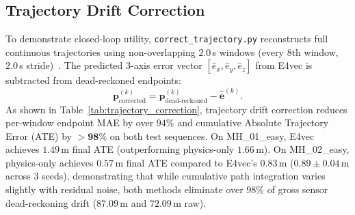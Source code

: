 \subsection{Trajectory Drift Correction}
To demonstrate closed-loop utility, \texttt{correct\_trajectory.py} reconstructs full continuous trajectories using non-overlapping $2.0$\,s windows (every 8th window, $2.0$\,s stride)~\cite{r5brossard2020}. The predicted 3-axis error vector $[\hat{e}_x, \hat{e}_y, \hat{e}_z]$ from E4vec is subtracted from dead-reckoned endpoints:
\begin{equation}
\mathbf{p}_{\mathrm{corrected}}^{(k)} = \mathbf{p}_{\mathrm{dead\text{-}reckoned}}^{(k)} - \hat{\mathbf{e}}^{(k)}.
\end{equation}
As shown in Table~\ref{tab:trajectory_correction}, trajectory drift correction reduces per-window endpoint MAE by over $94\%$ and cumulative Absolute Trajectory Error (ATE) by $\mathbf{>98\%}$ on both test sequences. On MH\_01\_easy, E4vec achieves $1.49$\,m final ATE (outperforming physics-only $1.66$\,m). On MH\_02\_easy, physics-only achieves $0.57$\,m final ATE compared to E4vec's $0.83$\,m ($0.89 \pm 0.04$\,m across 3 seeds), demonstrating that while cumulative path integration varies slightly with residual noise, both methods eliminate over $98\%$ of gross sensor dead-reckoning drift ($87.09$\,m and $72.09$\,m raw).

\begin{table}[t]
\centering
\caption{Dead-reckoned trajectory drift correction performance (C1).}
\label{tab:trajectory_correction}
\end{table}
